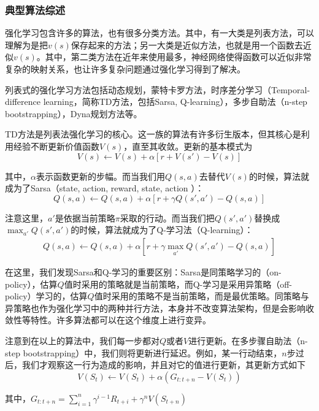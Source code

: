 \documentclass[degree=bachelor, tocarialchapter, pifootnote]{thuthesis}
\begin{document}
    \subsubsection{典型算法综述}
      强化学习包含许多的算法，也有很多分类方法。其中，有一大类是列表方法，可以理解为是把$v(s)$保存起来的方法；另一大类是近似方法，也就是用一个函数去近似$v(s)$\cite{Sutton_book}。其中，第二类方法在近年来使用最多，神经网络使得函数可以近似非常复杂的映射关系，也让许多复杂问题通过强化学习得到了解决。\par
      列表式的强化学习方法包括动态规划\cite{Bellman_DP}，蒙特卡罗方法，时序差分学习（Temporal-difference learning，简称TD方法，包括Sarsa\cite{Sutton_book}, Q-learning\cite{Q_learning}）\cite{Sutton_problem_formulation}，多步自助法\cite{n_step_bootstrapping}（n-step bootstrapping），Dyna规划方法\cite{Sutton_book}等。\par
      TD方法是列表法强化学习的核心。这一族的算法有许多衍生版本，但其核心是利用经验不断更新价值函数$V(s)$，直至其收敛。更新的基本模式为
      $$ V(s) \gets V(s) + \alpha [r + V(s') - V(s)] $$
      \par 其中，$\alpha$表示函数更新的步幅。而当我们用$Q(s, a)$去替代$V(s)$的时候，算法就成为了Sarsa（state, action, reward, state, action \cite{deepRL_overview}）：
      $$ Q(s, a) \gets Q(s, a) + \alpha [r + \gamma Q(s', a') - Q(s, a)] $$
      \par 注意这里，$a'$是依据当前策略$\pi$采取的行动。而当我们把$Q(s', a')$替换成$\max_{a'} Q(s', a')$的时候，算法就成为了Q-学习法（Q-learning）：
      \begin{align}
      \label{eq:Q_learning}
        Q(s, a) \gets Q(s, a) + \alpha [r + \gamma \max_{a'} Q(s', a') - Q(s, a)]
      \end{align}
      \par 在这里，我们发现Sarsa和Q-学习的重要区别：Sarsa是同策略学习的（on-policy），估算$Q$值时采用的策略就是当前策略，而Q-学习是采用异策略（off-policy）学习的，估算$Q$值时采用的策略不是当前策略，而是最优策略。同策略与异策略也作为强化学习中的两种并行方法，本身并不改变算法架构，但是会影响收敛性等特性。许多算法都可以在这个维度上进行变异。\par
      注意到在以上的算法中，我们每一步都对$Q$或者$V$进行更新。在多步骤自助法（n-step bootstrapping）中，我们则将更新进行延迟。例如，某一行动结束，$n$步过后，我们才观察这一行为造成的影响，并且对它的值进行更新，其更新方式如下
      $$ V(S_t) \gets V(S_t) + \alpha(G_{t:t+n} - V(S_t)) $$
      \par 其中，$G_{t:t+n} = \sum_{i = 1}^{n}\gamma^{i-1}R_{t+i} + \gamma^n V(S_{t+n})$
\end{document}
